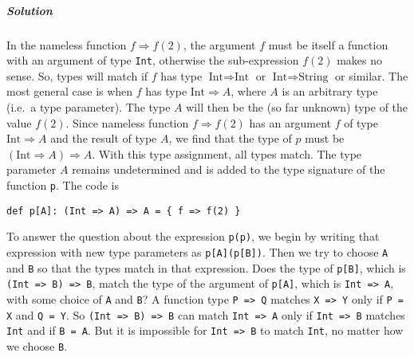 \subparagraph{Solution}

In the nameless function $f\Rightarrow f(2)$, the argument $f$ must
be itself a function with an argument of type \lstinline!Int!,
otherwise the sub-expression $f(2)$ makes no sense. So, types will
match if $f$ has type $\text{Int}\Rightarrow\text{Int}$ or $\text{Int}\Rightarrow\text{String}$
or similar. The most general case is when $f$ has type $\text{Int}\Rightarrow A$,
where $A$ is an arbitrary type (i.e.~a type parameter). The type
$A$ will then be the (so far unknown) type of the value $f(2)$.
Since nameless function $f\Rightarrow f(2)$ has an argument $f$
of type $\text{Int}\Rightarrow A$ and the result of type $A$, we
find that the type of $p$ must be $\left(\text{Int}\Rightarrow A\right)\Rightarrow A$.
With this type assignment, all types match. The type parameter $A$
remains undetermined and is added to the type signature of the function
\lstinline!p!. The code
is
\begin{lstlisting}
def p[A]: (Int => A) => A = { f => f(2) }
\end{lstlisting}
To answer the question about the expression \lstinline!p(p)!,
we begin by writing that expression with new type parameters as \lstinline!p[A](p[B])!.
Then we try to choose \lstinline!A!
and \lstinline!B! so that
the types match in that expression. Does the type of \lstinline!p[B]!,
which is \lstinline!(Int => B) => B!,
match the type of the argument of \lstinline!p[A]!,
which is \lstinline!Int => A!,
with some choice of \lstinline!A!
and \lstinline!B!? A function
type \lstinline!P => Q!
matches \lstinline!X => Y!
only if \lstinline!P = X!
and \lstinline!Q = Y!.
So \lstinline!(Int => B) => B!
can match \lstinline!Int => A!
only if \lstinline!Int => B!
matches \lstinline!Int!
and if \lstinline!B = A!.
But it is impossible for \lstinline!Int => B!
to match \lstinline!Int!,
no matter how we choose \lstinline!B!. 

